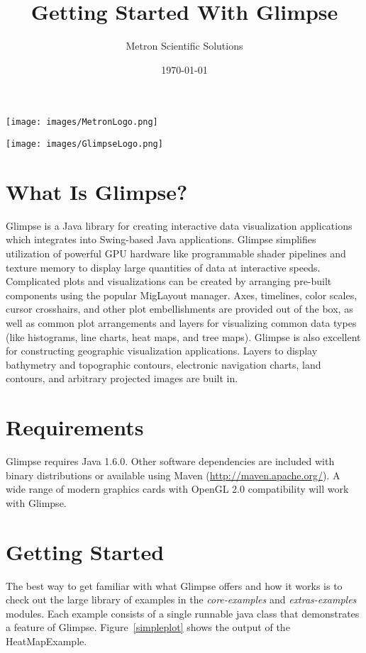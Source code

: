 \documentclass[12pt]{article}
\title{Getting Started With Glimpse}
\author{
        Metron Scientific Solutions\\
}
\date{\today}
\begin{document}
\maketitle

\begin{center}
\texttt{[image: images/MetronLogo.png]}
\end{center}

\begin{center}
\texttt{[image: images/GlimpseLogo.png]}
\end{center}

\section{What Is Glimpse?}

Glimpse is a Java library for creating interactive data visualization applications which integrates into Swing-based Java applications. Glimpse simplifies utilization of powerful GPU hardware like programmable shader pipelines and texture memory to display large quantities of data at interactive speeds. Complicated plots and visualizations can be created by arranging pre-built components using the popular MigLayout manager. Axes, timelines, color scales, cursor crosshairs, and other plot embellishments are provided out of the box, as well as common plot arrangements and layers for visualizing common data types (like histograms, line charts, heat maps, and tree maps). Glimpse is also excellent for constructing geographic visualization applications. Layers to display bathymetry and topographic contours, electronic navigation charts, land contours, and arbitrary projected images are built in.

\section{Requirements}

Glimpse requires Java 1.6.0. Other software dependencies are included with binary distributions or available using Maven (\url{http://maven.apache.org/}). A wide range of modern graphics cards with OpenGL 2.0 compatibility will work with Glimpse.

\section{Getting Started}

The best way to get familiar with what Glimpse offers and how it works is to check out the large library of examples in the \emph{core-examples} and \emph{extras-examples} modules. Each example consists of a single runnable java class that demonstrates a feature of Glimpse. Figure~\ref{simpleplot} shows the output of the HeatMapExample.
\end{document}
